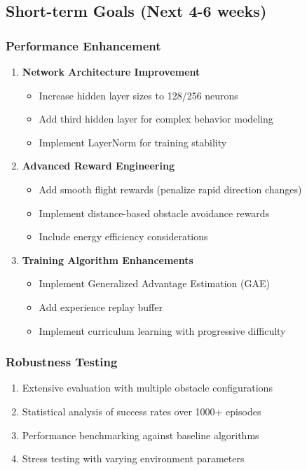 \documentclass[12pt,a4paper]{article}
\begin{document}
\subsection{Short-term Goals (Next 4-6 weeks)}

\subsubsection{Performance Enhancement}
\begin{enumerate}
    \item \textbf{Network Architecture Improvement}
        \begin{itemize}
            \item Increase hidden layer sizes to 128/256 neurons
            \item Add third hidden layer for complex behavior modeling
            \item Implement LayerNorm for training stability
        \end{itemize}
    
    \item \textbf{Advanced Reward Engineering}
        \begin{itemize}
            \item Add smooth flight rewards (penalize rapid direction changes)
            \item Implement distance-based obstacle avoidance rewards
            \item Include energy efficiency considerations
        \end{itemize}
    
    \item \textbf{Training Algorithm Enhancements}
        \begin{itemize}
            \item Implement Generalized Advantage Estimation (GAE)
            \item Add experience replay buffer
            \item Implement curriculum learning with progressive difficulty
        \end{itemize}
\end{enumerate}

\subsubsection{Robustness Testing}
\begin{enumerate}
    \item Extensive evaluation with multiple obstacle configurations
    \item Statistical analysis of success rates over 1000+ episodes
    \item Performance benchmarking against baseline algorithms
    \item Stress testing with varying environment parameters
\end{enumerate}
\end{document}
